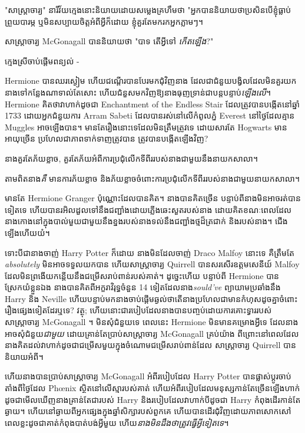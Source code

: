 {{"សាស្រ្តាចារ្យ" នារីវ័យក្មេងនោះនិយាយដោយសម្លេងគ្រហឹមថា "អ្នកបាននិយាយថាប្រសិនបើខ្ញុំធ្លាប់ព្រួយបារម្ភ ឬមិនសប្បាយចិត្តអំពីអ្វីក៏ដោយ ខ្ញុំគួរតែមករកអ្នកភ្លាមៗ។

សាស្រ្តាចារ្យ McGonagall បាននិយាយថា "បាទ តើអ្វីទៅ \emph{កើតឡើង}?"

ក្មេងស្រីចាប់ផ្តើមពន្យល់ -

\later

Hermione បានឈរស្ងៀម ហើយជណ្តើរបានបែរមកជុំវិញនាង ដែលជាជំនួយបង្វិលដែលមិនគួរយកនាងទៅកន្លែងណាទាល់តែសោះ ហើយជំនួសមកវិញឱ្យនាងធុញទ្រាន់ជាបន្តបន្ទាប់\emph{ឡើងលើ}។ Hermione គិតថាវាហាក់ដូចជា Enchantment of the Endless Stair ដែលត្រូវបានបង្កើតនៅឆ្នាំ 1733 ដោយអ្នកជំនួយការ Arram Sabeti ដែលបានរស់នៅលើកំពូលភ្នំ Everest នៅថ្ងៃដែលគ្មាន Muggles អាចឡើងបាន។ មានតែរឿងនោះទេដែលមិនត្រឹមត្រូវទេ ដោយសារតែ Hogwarts មានអាយុច្រើន ប្រហែលជាភាពទាក់ទាញត្រូវបាន \emph{}ត្រូវបានបង្កើតឡើងវិញ?

នាង​គួរ​តែ​ភ័យ​ខ្លាច, គួរ​តែ​ភ័យ​អំពី​ការ​ប្រជុំ​លើក​ទី​ពីរ​របស់​នាង​ជាមួយ​នឹង​នាយក​សាលា។

តាមពិតនាង\emph{គឺ} មានការភ័យខ្លាច និងភ័យខ្លាចចំពោះការប្រជុំលើកទីពីររបស់នាងជាមួយនាយកសាលា។

មានតែ Hermione Granger ប៉ុណ្ណោះដែលបានគិត។ នាងបានគិតច្រើន បន្ទាប់ពីនាងមិនអាចរត់បានទៀតទេ ហើយបានរអិលដួលទៅនឹងជញ្ជាំងដោយភ្លើងឆេះសួតរបស់នាង ដោយគិតខណៈពេលដែលនាងកោងនៅក្នុងបាល់មួយជាមួយនឹងខ្នងរបស់នាងទល់នឹងជញ្ជាំងថ្មដ៏ត្រជាក់ និងរបស់នាង។ ជើងឡើងហើយយំ។

ទោះបីជានាងចាញ់ Harry Potter ក៏ដោយ នាងមិនដែលចាញ់ Draco Malfoy នោះទេ គឺត្រឹមតែ \emph{ absolutely} មិនអាចទទួលយកបាន ហើយសាស្រ្តាចារ្យ Quirrell បានសរសើរឧត្តមសេនីយ៍ Malfoy ដែលមិនព្រងើយកន្តើយនឹងជម្រើសរាប់ពាន់របស់គាត់។ ដូច្នេះហើយ បន្ទាប់ពី Hermione បានស្រែកយំខ្លួនឯង នាងបានគិតពីអក្ខរាវិរុទ្ធចំនួន 14 ទៀតដែលនាង\emph{sould've} ព្យាយាមប្រឆាំងនឹង Harry និង Neville ហើយបន្ទាប់មកនាងចាប់ផ្តើមឆ្ងល់ថាតើនាងប្រហែលជាមានកំហុសដូចគ្នាចំពោះរឿងផ្សេងទៀតដែរឬទេ? វត្ថុ; ហើយនោះជារបៀបដែលនាងបានបញ្ចប់ដោយការគោះទ្វាររបស់សាស្រ្តាចារ្យ McGonagall ។ មិនសុំជំនួយទេ ពេលនេះ Hermione មិនមានគម្រោងអ្វីទេ ដែលនាងអាចសុំជំនួយ\emph{ជាមួយ} ដោយគ្រាន់តែប្រាប់សាស្រ្តាចារ្យ McGonagall គ្រប់យ៉ាង ពីព្រោះនៅពេលដែលនាងគិតដល់វាហាក់ដូចជាជម្រើសមួយក្នុងចំណោមជម្រើសរាប់ពាន់ដែល សាស្រ្តាចារ្យ Quirrell បាននិយាយអំពី។

ហើយនាងបានប្រាប់សាស្រ្តាចារ្យ McGonagall អំពីរបៀបដែល Harry Potter បានផ្លាស់ប្តូរចាប់តាំងពីថ្ងៃដែល Phœnix ស្ថិតនៅលើស្មារបស់គាត់ ហើយអំពីរបៀបដែលមនុស្សកាន់តែច្រើនឡើងហាក់ដូចជាមើលឃើញនាងគ្រាន់តែជារបស់ Harry និងរបៀបដែលវាហាក់បីដូចជា Harry កំពុងដើរកាន់តែឆ្ងាយ។ ហើយនៅឆ្ងាយពីអ្នកផ្សេងក្នុងឆ្នាំសិក្សារបស់ពួកគេ ហើយបានដើរជុំវិញដោយភាពសោកសៅ ពេលខ្លះដូចជាគាត់កំពុងបាត់បង់អ្វីមួយ ហើយ\emph{នាងមិនដឹងថាត្រូវធ្វើអ្វីទៀតទេ}។

}}
